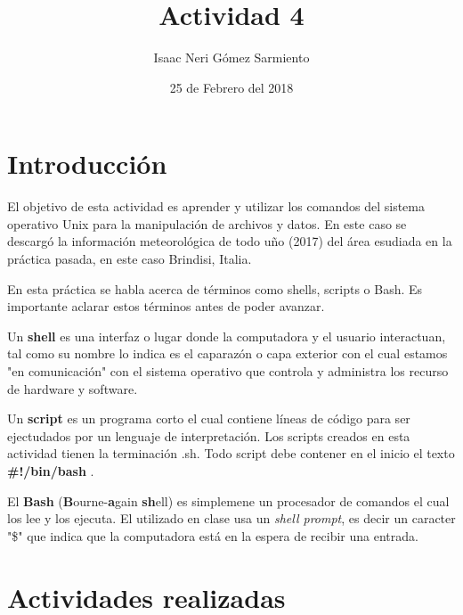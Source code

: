 \documentclass[a4paper]{article}
\title{Actividad 4}
\author{Isaac Neri Gómez Sarmiento}
\date {25 de Febrero del 2018}
\begin{document}
\maketitle


\section{Introducción}

El objetivo de esta actividad es aprender y utilizar los comandos del sistema operativo Unix para la manipulación de archivos y datos. En este caso se descargó la información meteorológica de todo uño (2017) del área esudiada en la práctica pasada, en este caso Brindisi, Italia.

En esta práctica se habla acerca de términos como shells, scripts o Bash. Es importante aclarar estos términos antes de poder avanzar.

Un \textbf{shell} es una interfaz o lugar donde la computadora y el usuario interactuan, tal como su nombre lo indica es el caparazón o capa exterior con el cual estamos "en comunicación" con el sistema operativo que controla y administra los recurso de hardware y software. 

Un \textbf{script} es un programa corto el cual contiene líneas de código para ser ejectudados por un lenguaje de interpretación. Los scripts creados en esta actividad tienen la terminación .sh. Todo script debe contener en el inicio el texto \textbf{ \#!/bin/bash }.

El \textbf{Bash} (\textbf{B}ourne-\textbf{a}gain \textbf{sh}ell) es simplemene un procesador de comandos el cual los lee y los ejecuta. El utilizado en clase usa un \textit{shell prompt}, es decir un caracter "\$" que indica que la computadora está en la espera de recibir una entrada. 



\section{Actividades realizadas}
\end{document}
